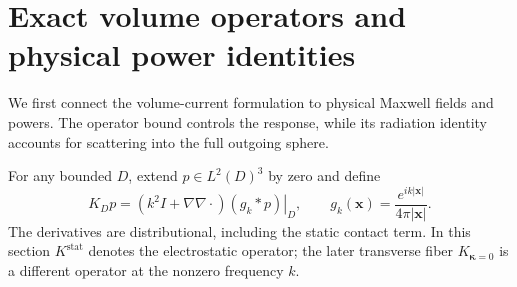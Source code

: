 \documentclass[11pt]{article}
\newcommand{\abs}[1]{\lvert #1\rvert}
\begin{document}
\section{Exact volume operators and physical power identities}\label{sec:green}
We first connect the volume-current formulation to physical Maxwell fields and powers. The operator bound controls the response, while its radiation identity accounts for scattering into the full outgoing sphere.

For any bounded $D$, extend $p\in L^2(D)^3$ by zero and define
\begin{equation}\label{eq:green}
 K_Dp=\left.(k^2I+\nabla\nabla\cdot)(g_k*p)\right|_D,
 \qquad g_k(\mathbf x)=\frac{e^{ik\abs{\mathbf x}}}{4\pi\abs{\mathbf x}}.
\end{equation}
The derivatives are distributional, including the static contact term. In this section $K^{\mathrm{stat}}$ denotes the electrostatic operator; the later transverse fiber $K_{\boldsymbol\kappa=0}$ is a different operator at the nonzero frequency $k$.
\end{document}
